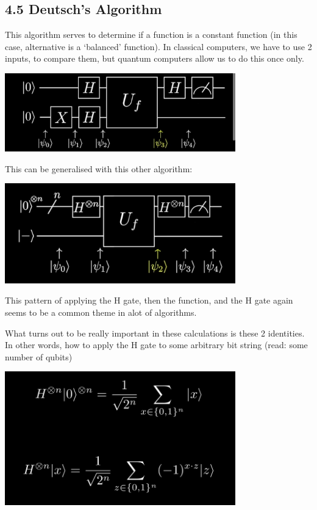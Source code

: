 \documentclass[10pt,oneside,a4paper]{article}
\begin{document}
\subsection*{4.5 Deutsch's Algorithm}

This algorithm serves to determine if a function is a constant function (in this case, alternative is a `balanced' function). In classical computers, we have to use 2 inputs, to compare them, but quantum computers allow us to do this once only. 

\begin{center}
\includegraphics[width=10cm]{12}
\end{center}

This can be generalised with this other algorithm: 

\begin{center}
\includegraphics[width=10cm]{13}
\end{center}

This pattern of applying the H gate, then the function, and the H gate again seems to be a common theme in alot of algorithms.

What turns out to be really important in these calculations is these 2 identities. In other words, how to apply the H gate to some arbitrary bit string (read: some number of qubits)

\begin{center}
\includegraphics[width=10cm]{14}
\end{center}
\end{document}
